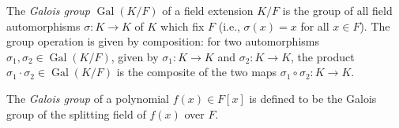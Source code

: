 \documentclass{article}
\begin{document}
The \emph{Galois group} $\operatorname{Gal}(K/F)$ of a field extension $K/F$ is the group of all field automorphisms $\sigma\colon K \to K$ of $K$ which fix $F$ (i.e., $\sigma(x) = x$ for all $x \in F$). The group operation is given by composition: for two automorphisms $\sigma_1, \sigma_2 \in \operatorname{Gal}(K/F)$, given by $\sigma_1\colon K \to K$ and $\sigma_2\colon K \to K$, the product $\sigma_1 \cdot \sigma_2 \in \operatorname{Gal}(K/F)$ is the composite of the two maps $\sigma_1 \circ \sigma_2\colon K \to K$.

The \emph{Galois group} of a polynomial $f(x) \in F[x]$ is defined to be the Galois group of the splitting field of $f(x)$ over $F$.
\end{document}
